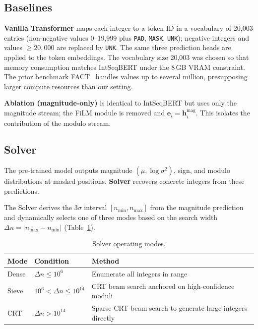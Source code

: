 \subsection{Baselines}
\label{sec:baselines}

\textbf{Vanilla Transformer} maps each integer to a token ID in a vocabulary of 20,003 entries
(non-negative values 0--19{,}999 plus \texttt{PAD}, \texttt{MASK}, \texttt{UNK}); negative
integers and values $\geq 20{,}000$ are replaced by \texttt{UNK}. The same three prediction heads are applied to the token
embeddings. The vocabulary size 20,003 was chosen so that memory consumption matches
IntSeqBERT under the 8\,GB VRAM constraint. The prior benchmark FACT~\cite{zurich-fact}
handles values up to several million, presupposing larger compute resources than our setting.

\textbf{Ablation (magnitude-only)} is identical to IntSeqBERT but uses only the magnitude
stream; the FiLM module is removed and $\mathbf{e}_i = \mathbf{h}_i^{\text{mag}}$. This
isolates the contribution of the modulo stream.

\subsection{Solver}
\label{sec:solver}

The pre-trained model outputs magnitude $(\mu, \log \sigma^2)$, sign, and modulo
distributions at masked positions. \textbf{Solver} recovers concrete integers from these
predictions.

The Solver derives the $3\sigma$ interval $[n_{\min}, n_{\max}]$ from the magnitude prediction
and dynamically selects one of three modes based on the search width
$\Delta n = |n_{\max} - n_{\min}|$ (Table~\ref{tab:solver}).

\begin{table}[htbp]
\caption{Solver operating modes.}
\label{tab:solver}
\centering
\begin{tabular}{llp{5.5cm}}
\hline
Mode     & Condition                              & Method \\
\hline
Dense    & $\Delta n \leq 10^6$                   & Enumerate all integers in range \\
Sieve    & $10^6 < \Delta n \leq 10^{14}$         & CRT beam search anchored on high-confidence moduli \\
CRT      & $\Delta n > 10^{14}$                   & Sparse CRT beam search to generate large integers directly \\
\hline
\end{tabular}
\end{table}

